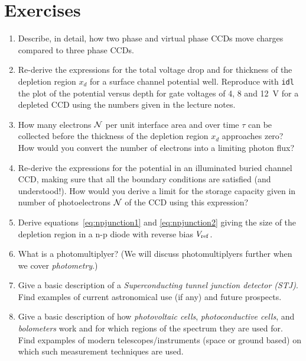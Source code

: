 \section{Exercises}

\begin{enumerate}
\item Describe, in detail, how two phase and virtual phase CCDs move charges
compared to three phase CCDs.
\item Re-derive the expressions for the total voltage drop and for thickness 
of the depletion region $x_d$ for a surface channel potential well. Reproduce
with {\tt idl} the plot of the potential versus depth for gate voltages of 
4, 8 and 12~V for a depleted CCD using the numbers given in the lecture notes.
\item How many electrons $\cal{N}$ per unit interface area and over time $\tau$
can be collected before the thickness of the depletion region $x_d$ 
approaches zero? How would you convert the number of electrons into a limiting
photon flux?
\item Re-derive the expressions for the potential in an illuminated buried
channel CCD, making sure that all the boundary conditions are satisfied (and 
understood!). How would you derive a limit for the storage capacity given 
in number of photoelectrons $\cal{N}$ of the CCD using this
expression?
\item Derive equations~\ref{eq:npjunction1} and \ref{eq:npjunction2}
  giving the size of the depletion region in a n-p diode with reverse
  bias $V_{\rm ref}$.
\item What is a photomultiplyer? (We will discuss photomultiplyers
  further when we cover {\it photometry}.)
\item Give a basic description of a {\it Superconducting tunnel
    junction detector (STJ)}. Find examples of current
  astronomical use (if any) and future prospects.
\item Give a basic description of how {\it photovoltaic cells}, 
{\it photoconductive cells}, and {\it bolometers} work and for which regions
of the spectrum they are used for. Find expamples of modern telescopes/instruments
(space or ground based) on which such measurement techniques are used.
\end{enumerate}

%
